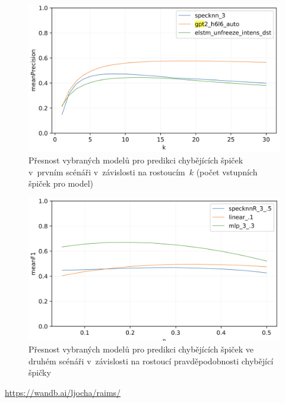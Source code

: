 \documentclass[a4paper,11pt]{article}
\begin{document}
\begin{figure}
\begin{center}
\includegraphics[width=.8\hsize]{result-missing}
\end{center}
\caption{Přesnost vybraných modelů pro predikci chybějících špiček v~prvním scénáři v~závislosti na rostoucím~$k$
(počet vstupních špiček pro model)
}
\label{f:result-missing}
\end{figure}

\begin{figure}
\begin{center}
\includegraphics[width=.8\hsize]{result-wrong}
\end{center}
\caption{Přesnost vybraných modelů pro predikci chybějících špiček ve druhém scénáři v~závislosti na rostoucí
pravděpodobnosti chybějící špičky}
\label{f:result-wrong}
\end{figure}







\url{https://wandb.ai/ljocha/raims/}



\end{document}
